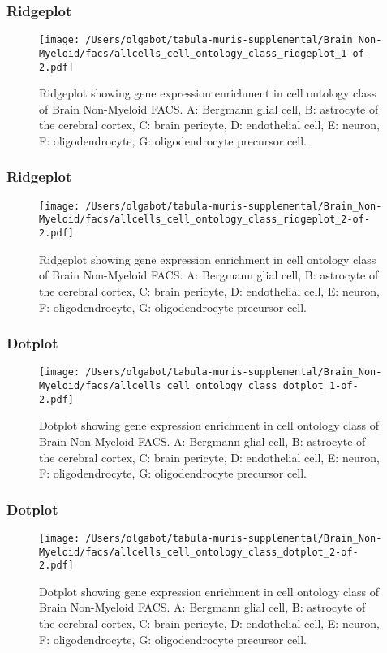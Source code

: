 \clearpage
\clearpage
\subsubsection{Ridgeplot}
\begin{figure}[h]
\centering
\texttt{[image: /Users/olgabot/tabula-muris-supplemental/Brain\_Non-Myeloid/facs/allcells\_cell\_ontology\_class\_ridgeplot\_1-of-2.pdf]}

\caption{ Ridgeplot  showing gene expression enrichment in cell ontology class of Brain Non-Myeloid FACS. A: Bergmann glial cell, B: astrocyte of the cerebral cortex, C: brain pericyte, D: endothelial cell, E: neuron, F: oligodendrocyte, G: oligodendrocyte precursor cell.}
\end{figure}


\clearpage
\clearpage
\subsubsection{Ridgeplot}
\begin{figure}[h]
\centering
\texttt{[image: /Users/olgabot/tabula-muris-supplemental/Brain\_Non-Myeloid/facs/allcells\_cell\_ontology\_class\_ridgeplot\_2-of-2.pdf]}

\caption{ Ridgeplot  showing gene expression enrichment in cell ontology class of Brain Non-Myeloid FACS. A: Bergmann glial cell, B: astrocyte of the cerebral cortex, C: brain pericyte, D: endothelial cell, E: neuron, F: oligodendrocyte, G: oligodendrocyte precursor cell.}
\end{figure}


\clearpage
\clearpage
\subsubsection{Dotplot}
\begin{figure}[h]
\centering
\texttt{[image: /Users/olgabot/tabula-muris-supplemental/Brain\_Non-Myeloid/facs/allcells\_cell\_ontology\_class\_dotplot\_1-of-2.pdf]}

\caption{ Dotplot  showing gene expression enrichment in cell ontology class of Brain Non-Myeloid FACS. A: Bergmann glial cell, B: astrocyte of the cerebral cortex, C: brain pericyte, D: endothelial cell, E: neuron, F: oligodendrocyte, G: oligodendrocyte precursor cell.}
\end{figure}


\clearpage
\clearpage
\subsubsection{Dotplot}
\begin{figure}[h]
\centering
\texttt{[image: /Users/olgabot/tabula-muris-supplemental/Brain\_Non-Myeloid/facs/allcells\_cell\_ontology\_class\_dotplot\_2-of-2.pdf]}

\caption{ Dotplot  showing gene expression enrichment in cell ontology class of Brain Non-Myeloid FACS. A: Bergmann glial cell, B: astrocyte of the cerebral cortex, C: brain pericyte, D: endothelial cell, E: neuron, F: oligodendrocyte, G: oligodendrocyte precursor cell.}
\end{figure}


